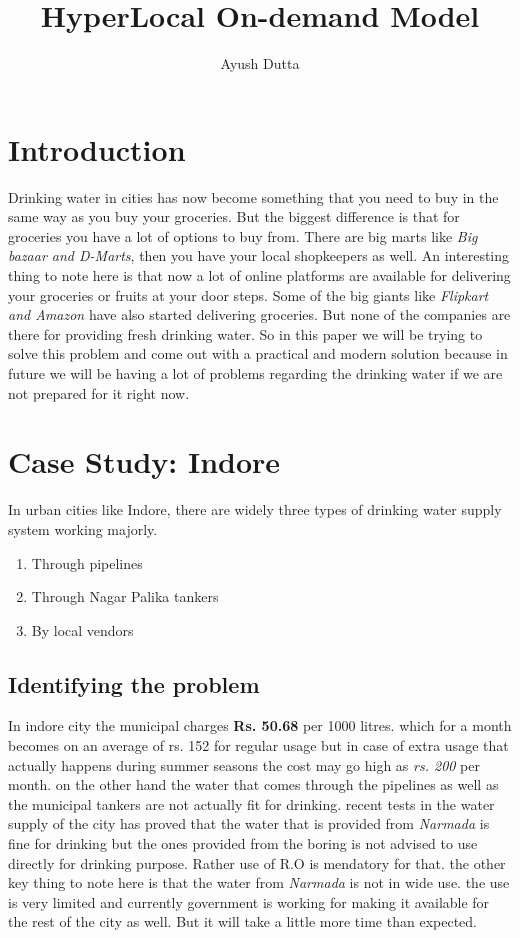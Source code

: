 \documentclass[a4paper, 12pt]{report}
\title{HyperLocal On-demand Model }
\author{Ayush Dutta}
\begin{document}
\maketitle

\section{Introduction}
Drinking water in cities has now become something that you need to buy in the same way as you buy your groceries. But the biggest difference is that for groceries you have a lot of options to buy from. There are big marts like
\textit{Big bazaar and D-Marts}, 
then you have your local shopkeepers as well. An interesting thing to note here is that now a lot of online platforms are available for delivering your groceries or fruits at your door steps. Some of the big giants like
\textit{Flipkart and Amazon} 
have also started delivering groceries. But none of the companies are there for providing fresh drinking water. So in this paper we will be trying to solve this problem and come out with a practical and modern solution because in future we will be having a lot of problems regarding the drinking water if we are not prepared for it right now.

\section{Case Study: Indore}
In urban cities like Indore, there are widely three types of drinking water supply system working majorly.
\begin{enumerate}
    \item Through pipelines
    \item Through Nagar Palika tankers
    \item By local vendors
\end{enumerate}

\subsection[short]{Identifying the problem}
In indore city the municipal charges \textbf{Rs. 50.68} per 1000 litres. which for a month becomes on an average of rs. 152 for regular usage but in case of extra usage 
that actually happens during summer seasons the cost may go high as \textit{rs. 200} per month. on the other hand the water that comes through the pipelines as well as 
the municipal tankers are not actually fit for drinking. recent tests in the water supply of the city has proved that the water that is provided from \textit{Narmada} is 
fine for drinking but the ones provided from the boring is not advised to use directly for drinking purpose. Rather use of R.O is mendatory for that. the other key thing 
to note here is that the water from \textit{Narmada} is not in wide use. the use is very limited and currently government is working for making it available for the rest
of the city as well. But it will take a little more time than expected. 
\end{document}
